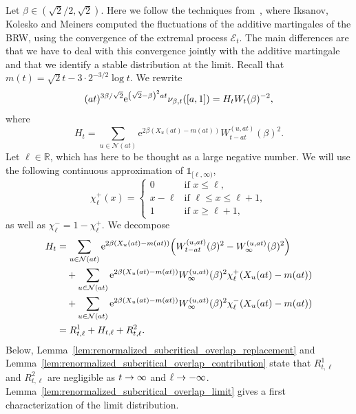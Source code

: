 \documentclass[AHL,Unicode,longabstracts,published]{cedram}
\newcommand{\e}{\mathrm{e}}
\newcommand{\R}{\mathbb{R}}
\newcommand\1{\mathds{1}}
\newcommand{\cE}{\mathcal{E}}
\newcommand{\cN}{\mathcal{N}}
\let\originalleft\left
\let\originalright\right
\renewcommand{\left}{\mathopen{}\mathclose\bgroup\originalleft}
\renewcommand{\right}{\aftergroup\egroup\originalright}
\renewcommand*{\to}{\mathchoice{\longrightarrow}{\rightarrow}{\rightarrow}{\rightarrow}}
\begin{document}
Let $\beta \in (\sqrt{2}/2, \sqrt{2})$. Here we follow the techniques from~\cite[Theorem~2.5]{IksanovKoleskoMeiners2020}, where Iksanov, Kolesko and Meiners computed the fluctuations of the additive martingales of the BRW, using the convergence of the extremal process $\cE_t$. The main differences are that we have to deal with this convergence jointly with the additive martingale and that we identify a stable distribution at the limit. Recall that $m(t) = \sqrt{2}t - 3 \cdot 2^{-3/2} \log t$. We rewrite
\begin{equation*}
(at)^{3 \beta/\sqrt{2}} \e^{\left(\sqrt{2} - \beta\right)^2 at} \nu_{\beta,t}([a, 1]) = H_t W_t(\beta)^{-2},
\end{equation*}
where
\begin{equation*}
H_t = \sum_{u \in \cN(at)} \e^{2 \beta (X_u(at) - m(at))} W_{t - at}^{(u, at)}(\beta)^2.
\end{equation*}
Let $\ell \in \R$, which has here to be thought as a large negative number. We will use the following continuous approximation of $\1_{[\ell, \infty)}$,
\begin{equation*}
\chi_\ell^+(x) =
\begin{cases}
0 & \text{if } x \leq \ell, \\
x - \ell &\text{if } \ell \leq x \leq \ell+1, \\
1 & \text{if } x \geq \ell+1,
\end{cases}
\end{equation*}
as well as $\chi_\ell^- = 1 - \chi_\ell^+$. We decompose
\begin{align*}
H_t &= \sum_{u \in \cN(at)} \e^{2 \beta (X_u(at) - m(at))} \left(W_{t - at}^{(u, at)}(\beta)^2 - W_\infty^{(u, at)}(\beta)^2\right)  \\
&\quad + \sum_{u \in \cN(at)} \e^{2 \beta (X_u(at) - m(at))} W_\infty^{(u, at)}(\beta)^2 \chi_\ell^+(X_u(at) - m(at))  \\
&\quad + \sum_{u \in \cN(at)} \e^{2 \beta (X_u(at) - m(at))} W_\infty^{(u, at)}(\beta)^2 \chi_\ell^-(X_u(at) - m(at))  \\
&= R_{t, \ell}^1 + H_{t, \ell} + R_{t, \ell}^2. 
\end{align*}
Below, Lemma~\ref{lem:renormalized_subcritical_overlap_replacement} and Lemma~\ref{lem:renormalized_subcritical_overlap_contribution} state that $R_{t, \ell}^1$ and $R_{t, \ell}^2$ are negligible as $t \to \infty$ and $\ell \to -\infty$. Lemma~\ref{lem:renormalized_subcritical_overlap_limit} gives a first characterization of the limit distribution.
\end{document}
